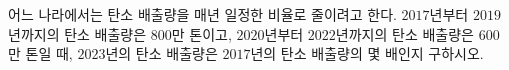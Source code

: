 어느 나라에서는 탄소 배출량을 매년 일정한 비율로 줄이려고 한다. $2017$년부터 $2019$년까지의 탄소 배출량은 $800$만 톤이고, $2020$년부터 $2022$년까지의 탄소 배출량은 $600$만 톤일 때, $2023$년의 탄소 배출량은 $2017$년의 탄소 배출량의 몇 배인지 구하시오.
